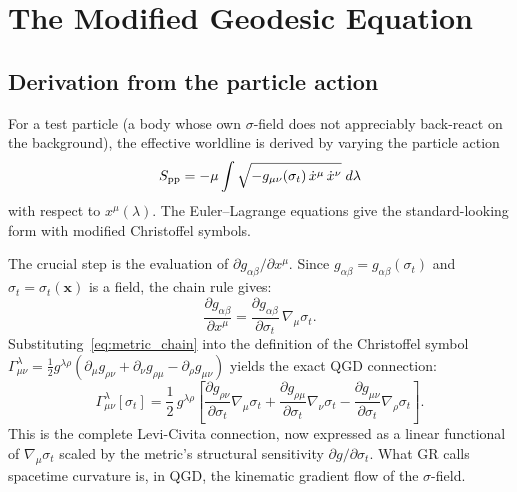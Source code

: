 \documentclass[11pt,a4paper]{article}
\theoremstyle{plain}
\theoremstyle{definition}
\theoremstyle{remark}
\newcommand{\sigt}{\sigma_t}
\newcommand{\half}{\tfrac{1}{2}}
\begin{document}
\section{The Modified Geodesic Equation}
\label{sec:modified_geodesic}

\subsection{Derivation from the particle action}

For a test particle (a body whose own $\sigma$-field does not appreciably back-react
on the background), the effective worldline is derived by varying the particle action
\begin{equation}
  S_{\rm pp} = -\mu\int \sqrt{-g_{\mu\nu}(\sigt)\,\dot x^\mu\,\dot x^\nu}\;d\lambda
  \label{eq:particle_action}
\end{equation}
with respect to $x^\mu(\lambda)$.  The Euler--Lagrange equations give the standard-looking
form with modified Christoffel symbols.

The crucial step is the evaluation of $\partial g_{\alpha\beta}/\partial x^\mu$.  Since
$g_{\alpha\beta} = g_{\alpha\beta}(\sigt)$ and $\sigt = \sigt(\mathbf{x})$ is a field, the
chain rule gives:
\begin{equation}
  \frac{\partial g_{\alpha\beta}}{\partial x^\mu}
  = \frac{\partial g_{\alpha\beta}}{\partial\sigt}\,\nabla_\mu\sigt.
  \label{eq:metric_chain}
\end{equation}
Substituting~\eqref{eq:metric_chain} into the definition of the Christoffel symbol
$\Gamma^\lambda_{\mu\nu} = \half g^{\lambda\rho}(\partial_\mu g_{\rho\nu}
+ \partial_\nu g_{\rho\mu} - \partial_\rho g_{\mu\nu})$ yields the exact QGD
connection:
\begin{equation}
  \boxed{
  \Gamma^\lambda_{\mu\nu}[\sigt]
  = \frac{1}{2}\,g^{\lambda\rho}
  \!\left[
    \frac{\partial g_{\rho\nu}}{\partial\sigt}\nabla_\mu\sigt
  + \frac{\partial g_{\rho\mu}}{\partial\sigt}\nabla_\nu\sigt
  - \frac{\partial g_{\mu\nu}}{\partial\sigt}\nabla_\rho\sigt
  \right].
  }
  \label{eq:QGD_connection}
\end{equation}
This is the complete Levi-Civita connection, now expressed as a linear functional of
$\nabla_\mu\sigt$ scaled by the metric's structural sensitivity $\partial g/\partial\sigt$.
What GR calls spacetime curvature is, in QGD, the kinematic gradient flow of the
$\sigma$-field.
\end{document}
